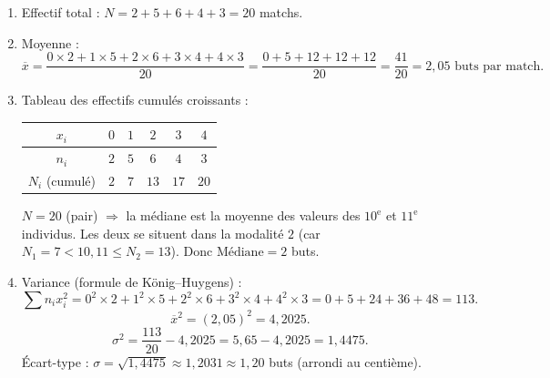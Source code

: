 \documentclass[11pt]{article}
\begin{document}
\begin{corrige}
\begin{enumerate}
\item Effectif total : $N = 2+5+6+4+3 = 20$ matchs.
\item Moyenne :
\[
\overline{x} = \frac{0\times2 + 1\times5 + 2\times6 + 3\times4 + 4\times3}{20}
= \frac{0+5+12+12+12}{20} = \frac{41}{20} = 2,05 \text{ buts par match}.
\]
\item Tableau des effectifs cumulés croissants :
\begin{center}
\begin{tabular}{|c|ccccc|}
\hline
$ x_i $ & $0$ & $1$ & $2$ & $3$ & $4$ \\
\hline
$ n_i $ & $2$ & $5$ & $6$ & $4$ & $3$ \\
\hline
$ N_i $ (cumulé) & $2$ & $7$ & $13$ & $17$ & $20$ \\
\hline
\end{tabular}
\end{center}
$N=20$ (pair) $\Rightarrow$ la médiane est la moyenne des valeurs des $10^{\text{e}}$ et $11^{\text{e}}$ individus. Les deux se situent dans la modalité $2$ (car $N_1=7 < 10,11 \le N_2=13$). Donc $\text{Médiane} = 2$ buts.
\item Variance (formule de König–Huygens) :
\[
\sum n_i x_i^2 = 0^2\!\times2 + 1^2\!\times5 + 2^2\!\times6 + 3^2\!\times4 + 4^2\!\times3 = 0+5+24+36+48 = 113.
\]
\[
\overline{x}^2 = (2,05)^2 = 4,2025.
\]
\[
\sigma^2 = \frac{113}{20} - 4,2025 = 5,65 - 4,2025 = 1,4475.
\]
Écart-type : $\sigma = \sqrt{1,4475} \approx 1,2031 \approx 1,20$ buts (arrondi au centième).
\end{enumerate}
\end{corrige}
\end{document}
